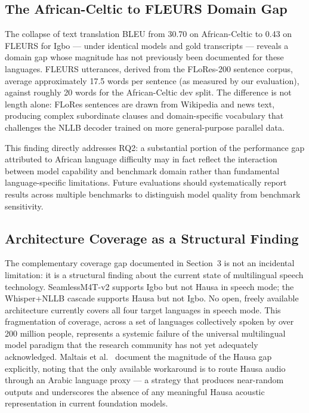 \documentclass[10pt,twocolumn]{article}
\begin{document}
\subsection{The African-Celtic to FLEURS Domain Gap}

The collapse of text translation BLEU from 30.70 on African-Celtic
to 0.43 on FLEURS for Igbo --- under identical models and gold
transcripts --- reveals a domain gap whose magnitude has not
previously been documented for these languages.
FLEURS utterances, derived from the FLoRes-200 sentence corpus,
average approximately 17.5 words per sentence (as measured by our
evaluation), against roughly 20 words for the African-Celtic dev
split.
The difference is not length alone: FLoRes sentences are drawn
from Wikipedia and news text, producing complex subordinate
clauses and domain-specific vocabulary that challenges the NLLB
decoder trained on more general-purpose parallel data.

This finding directly addresses RQ2: a substantial portion of the
performance gap attributed to African language difficulty may in
fact reflect the interaction between model capability and benchmark
domain rather than fundamental language-specific limitations.
Future evaluations should systematically report results across
multiple benchmarks to distinguish model quality from benchmark
sensitivity.

\subsection{Architecture Coverage as a Structural Finding}

The complementary coverage gap documented in Section~3 is not an
incidental limitation: it is a structural finding about the current
state of multilingual speech technology.
SeamlessM4T-v2 supports Igbo but not Hausa in speech mode; the
Whisper+NLLB cascade supports Hausa but not Igbo.
No open, freely available architecture currently covers all four
target languages in speech mode.
This fragmentation of coverage, across a set of languages
collectively spoken by over 200 million people, represents a
systemic failure of the universal multilingual model paradigm
that the research community has not yet adequately acknowledged.
Maltais et al.~\cite{maltais2026naijas2st} document the
magnitude of the Hausa gap explicitly, noting that the only
available workaround is to route Hausa audio through an Arabic
language proxy --- a strategy that produces near-random outputs
and underscores the absence of any meaningful Hausa acoustic
representation in current foundation models.
\end{document}
